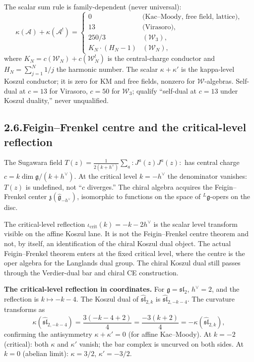 \documentclass[11pt,reqno]{amsart}
\theoremstyle{definition}
\theoremstyle{remark}
\providecommand{\cA}{\mathcal{A}}
\providecommand{\fg}{\mathfrak{g}}
\providecommand{\fsl}{\mathfrak{sl}}
\numberwithin{equation}{section}
\begin{document}
The scalar sum
rule is family-dependent (never universal):
\[
\kappa(\cA)+\kappa(\cA^!)=\begin{cases}0&\text{(Kac--Moody, free field, lattice)},\\ 13&\text{(Virasoro)},\\ 250/3&(\mathcal W_3),\\ K_N\cdot(H_N-1)&(\mathcal W_N),\end{cases}
\]
where $K_N=c(\mathcal W_N)+c(\mathcal W_N^!)$ is the central-charge
conductor and $H_N=\sum_{j=1}^N 1/j$ the harmonic number.
The scalar $\kappa+\kappa'$ is the kappa-level Koszul conductor;
it is zero for KM and free fields, nonzero for $\mathcal W$-algebras.
Self-dual at $c=13$ for Virasoro, $c=50$ for $\mathcal W_3$; qualify
``self-dual at $c=13$ under Koszul
duality,'' never unqualified.

\subsection*{2.6.\enspace Feigin--Frenkel centre and the critical-level reflection}

The Sugawara field
$T(z)=\tfrac{1}{2(k+h^\vee)}\sum_a{:}J^a(z)J^a(z){:}$
has central charge $c=k\dim\mathfrak g/(k+h^\vee)$. At the critical
level $k=-h^\vee$ the denominator vanishes: $T(z)$ is undefined, not
``$c$ diverges.'' The chiral algebra acquires the Feigin--Frenkel
center $\mathfrak z(\widehat{\mathfrak g}_{-h^\vee})$, isomorphic to
functions on the space of ${}^L\mathfrak g$-opers on the disc.

The critical-level reflection
\(\iota_{\mathrm{crit}}(k)=-k-2h^\vee\) is the scalar level transform
visible on the affine Koszul lane. It is not the Feigin--Frenkel
centre theorem and not, by itself, an identification of the chiral
Koszul dual object. The actual Feigin--Frenkel theorem enters at the
fixed critical level, where the centre is the oper algebra for the
Langlands dual group. The chiral Koszul dual still passes through the
Verdier-dual bar and chiral CE construction.

\medskip
\noindent\textbf{The critical-level reflection in coordinates.}\enspace
For $\fg=\fsl_2$, $h^\vee=2$, and the reflection is $k\mapsto -k-4$.
The Koszul dual of $\widehat{\fsl}_{2,k}$ is
$\widehat{\fsl}_{2,-k-4}$. The curvature transforms as
\[
\kappa(\widehat{\fsl}_{2,-k-4})=\frac{3(-k-4+2)}{4}=\frac{-3(k+2)}{4}=-\kappa(\widehat{\fsl}_{2,k}),
\]
confirming the antisymmetry $\kappa+\kappa'=0$ (for affine Kac--Moody). At
$k=-2$ (critical): both $\kappa$ and $\kappa'$ vanish; the bar complex
is uncurved on both sides. At $k=0$ (abelian limit): $\kappa=3/2$,
$\kappa'=-3/2$.
\end{document}
